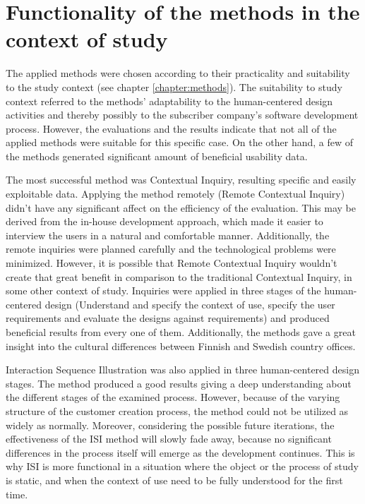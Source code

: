 \documentclass[12pt,a4paper,oneside,pdftex]{report}
\begin{document}
\section{Functionality of the methods in the context of study}
The applied methods were chosen according to their practicality and suitability to the study context (see chapter \ref{chapter:methods}). The suitability to study context referred to the methods' adaptability to the human-centered design activities and thereby possibly to the subscriber company's software development process. However, the evaluations and the results indicate that not all of the applied methods were suitable for this specific case. On the other hand, a few of the methods generated significant amount of beneficial usability data. 

The most successful method was Contextual Inquiry, resulting specific and easily exploitable data. Applying the method remotely (Remote Contextual Inquiry) didn't have any significant affect on the efficiency of the evaluation. This may be derived from the in-house development approach, which made it easier to interview the users in a natural and comfortable manner. Additionally, the remote inquiries were planned carefully and the technological problems were minimized. However, it is possible that Remote Contextual Inquiry wouldn't create that great benefit in comparison to the traditional Contextual Inquiry, in some other context of study. Inquiries were applied in three stages of the human-centered design (Understand and specify the context of use, specify the user requirements and evaluate the designs against requirements) and produced beneficial results from every one of them. Additionally, the methods gave a great insight into the cultural differences between Finnish and Swedish country offices.

Interaction Sequence Illustration was also applied in three human-centered design stages. The method produced a good results giving a deep understanding about the different stages of the examined process. However, because of the varying structure of the customer creation process, the method could not be utilized as widely as normally. Moreover, considering the possible future iterations, the effectiveness of the ISI method will slowly fade away, because no significant differences in the process itself will emerge as the development continues. This is why ISI is more functional in a situation where the object or the process of study is static, and when the context of use need to be fully understood for the first time. 
\end{document}
